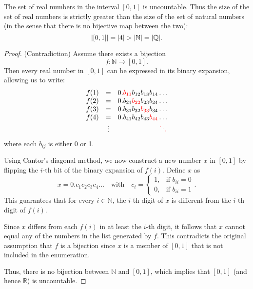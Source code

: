 \begin{theorem}
\label{thm:diagonal}
The set of real numbers in the interval \([0,1]\) is uncountable. 
Thus the size of the set of real numbers is strictly greater than the size of the set of natural numbers (in the sense that there is no bijective map between the two):
\[
  \lvert [0,1] \rvert = \lvert 4 \rvert > \lvert \mathbb{N} \rvert = \lvert \mathbb{Q} \rvert. \qedhere
\] 
\end{theorem}
\begin{proof} (Contradiction)
Assume there exists a bijection
\[
f: \mathbb{N} \to [0,1].
\]
Then every real number in \([0,1]\) can be expressed in its binary expansion, allowing us to write:
\[
\begin{array}{rcl}
f(1) &=& 0.\textcolor{red}{b_{11}}b_{12}b_{13}b_{14}\dots \\
f(2) &=& 0.b_{21}\textcolor{red}{b_{22}}b_{23}b_{24}\dots \\
f(3) &=& 0.b_{31}b_{32}\textcolor{red}{b_{33}}b_{34}\dots \\
f(4) &=& 0.b_{41}b_{42}b_{43}\textcolor{red}{b_{44}}\dots \\
&\vdots& \hfill \textcolor{red}{\ddots} \\
\end{array}
\]
where each \(b_{ij}\) is either 0 or 1.

Using Cantor's diagonal method, we now construct a new number \(x\) in \([0,1]\) by flipping the \(i\)-th bit of the binary expansion of \(f(i)\). Define \(x\) as
\[
x = 0.c_1c_2c_3c_4\dots
\quad
\text{
with
}
\quad
c_i = \begin{cases}
1, & \text{if } b_{ii} = 0 \\
0, & \text{if } b_{ii} = 1
\end{cases}\text{.}
\]
This guarantees that for every \(i \in \mathbb{N}\), the \(i\)-th digit of \(x\) is different from the \(i\)-th digit of \(f(i)\).

Since \(x\) differs from each \(f(i)\) in at least the \(i\)-th digit, it follows that \(x\) cannot equal any of the numbers in the list generated by \(f\). This contradicts the original assumption that \(f\) is a bijection since \(x\) is a member of \([0,1]\) that is not included in the enumeration.

Thus, there is no bijection between \(\mathbb{N}\) and \([0,1]\), which implies that \([0,1]\) (and hence \(\mathbb{R}\)) is uncountable.
\end{proof}
